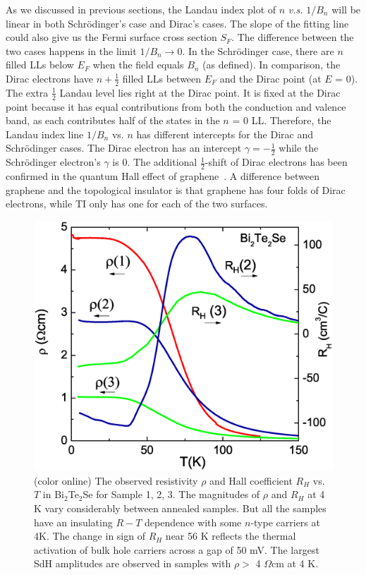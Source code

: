 As we discussed in previous sections, the Landau index plot of $n$ \emph{v.s.} $1/B_n$ will be linear in both Schr\"{o}dinger's case and Dirac's cases. The slope of the fitting line could also give us the Fermi surface cross section $S_F$. The difference between the two cases happens in the limit
$1/B_n\to 0$. In the Schr\"{o}dinger case, there are $n$ filled LLs below $E_F$ when the field equals $B_n$ (as defined).
In comparison, the Dirac electrons have 
$n+\frac12$ filled LLs between $E_F$ and the Dirac point (at $E$ = 0). The extra $\frac12$ Landau level lies right at the Dirac point. It is fixed at the Dirac point because it has equal contributions from both the conduction and valence band, as each contributes half of the states in the $n$ = 0 LL. Therefore, the Landau index line $1/B_n$ vs. $n$ has different intercepts for the Dirac and Schr\"{o}dinger cases. The Dirac electron has an intercept $\gamma = -\frac12$ while the Schr\"{o}dinger electron's $\gamma$ is 0. The additional $\frac12$-shift of Dirac electrons has been confirmed in the quantum Hall effect of graphene~\cite{Kim}. A difference between graphene and the topological insulator is that graphene has four folds of Dirac electrons, while TI only has one for each of the two surfaces.





\begin{figure}[!htbp]
  \begin{center}
\includegraphics[width=0.9\linewidth]{ch-bts/figures/FigRvsT.eps}
\caption{\label{figRvsT} (color online)
The observed resistivity $\rho$ and Hall coefficient $R_H$ vs. $T$ in Bi$_2$Te$_2$Se for Sample 1, 2, 3. The magnitudes of
$\rho$ and $R_H$ at 4 K vary considerably between annealed samples. But all the samples have an insulating $R-T$ dependence with some $n$-type carriers at 4K. The change in sign of $R_H$ 
near 56 K reflects the thermal activation of bulk hole carriers across a gap of 50 mV.
The largest SdH amplitudes are observed in samples with $\rho >$ 4 $\Omega$cm at 4 K.
}
  \end{center}
\end{figure}

